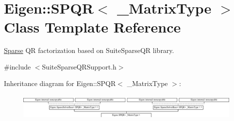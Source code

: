 \hypertarget{class_eigen_1_1_s_p_q_r}{}\section{Eigen\+:\+:S\+P\+QR$<$ \+\_\+\+Matrix\+Type $>$ Class Template Reference}
\label{class_eigen_1_1_s_p_q_r}


\hyperlink{struct_eigen_1_1_sparse}{Sparse} QR factorization based on Suite\+Sparse\+QR library.  




{\ttfamily \#include $<$Suite\+Sparse\+Q\+R\+Support.\+h$>$}

Inheritance diagram for Eigen\+:\+:S\+P\+QR$<$ \+\_\+\+Matrix\+Type $>$\+:\begin{figure}[H]
\begin{center}
\leavevmode
\includegraphics[height=1.333333cm]{class_eigen_1_1_s_p_q_r}
\end{center}
\end{figure}
